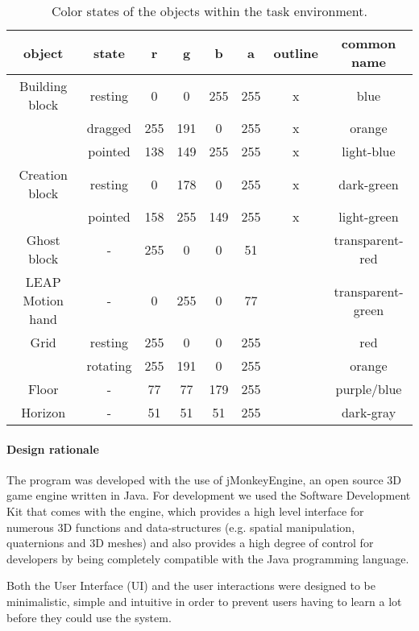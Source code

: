 \begin{table}[H]
\centering
\begin{tabular}{|c|c|c|c|c|c|c|c|}
\hline
\textbf{object} & \textbf{state} & \textbf{r} & \textbf{g} & \textbf{b} & \textbf{a} & \textbf{outline} & \textbf{common name}\\ \hline\hline
Building block & resting & 0 & 0 & 255 & 255 & x & blue \\ 
 & dragged & 255 & 191 & 0 & 255 & x & orange \\ 
 & pointed & 138 & 149 & 255 & 255 & x & light-blue \\ \hline 
Creation block & resting & 0 & 178 & 0 & 255 & x & dark-green \\ 
 & pointed & 158 & 255 & 149 & 255 & x & light-green\\ \hline 
Ghost block & - & 255 & 0 & 0 & 51 & & transparent-red \\ \hline
LEAP Motion hand & - & 0 & 255 & 0 & 77 & & transparent-green  \\ \hline 
Grid & resting & 255 & 0 & 0 & 255 & & red \\ 
 & rotating & 255 & 191 & 0 & 255 & & orange \\ \hline 
Floor & - & 77 & 77 & 179 & 255 & & purple/blue \\ \hline 
Horizon & - & 51 & 51 & 51 & 255 & & dark-gray \\ \hline 
\end{tabular}
\caption{\label{tab:colors} Color states of the objects within the task environment.}
\end{table}

\paragraph{Design rationale}
The program was developed with the use of jMonkeyEngine, an open source 3D game engine written in Java. For development we used the Software Development Kit that comes with the engine, which provides a high level interface for numerous 3D functions and data-structures (e.g. spatial manipulation, quaternions and 3D meshes) and also provides a high degree of control for developers by being completely compatible with the Java programming language. 

Both the User Interface (UI) and the user interactions were designed to be minimalistic, simple and intuitive in order to prevent users having to learn a lot before they could use the system. 
